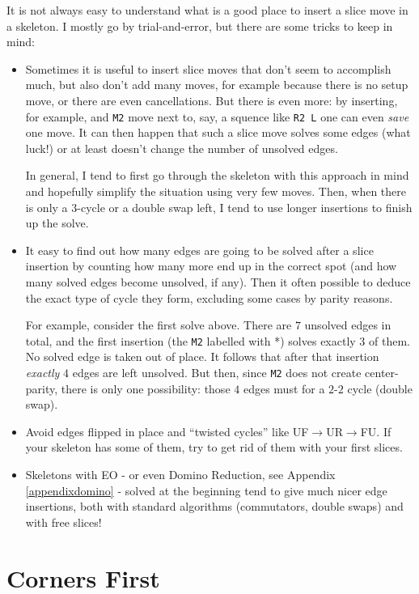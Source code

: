 \documentclass[11pt,a4paper]{book}
\newcommand{\m}{\texttt}
\begin{document}
It is not always easy to understand what is a good place to insert a slice move in a skeleton. I mostly go by trial-and-error, but there are some tricks to keep in mind:
\begin{itemize}
\item Sometimes it is useful to insert slice moves that don't seem to accomplish much, but also don't add many moves, for example because there is no setup move, or there are even cancellations. But there is even more: by inserting, for example, and \m{M2} move next to, say, a squence like \m{R2 L} one can even \textit{save} one move. It can then happen that such a slice move solves some edges (what luck!) or at least doesn't change the number of unsolved edges.

In general, I tend to first go through the skeleton with this approach in mind and hopefully simplify the situation using very few moves. Then, when there is only a 3-cycle or a double swap left, I tend to use longer insertions to finish up the solve.
\item It easy to find out how many edges are going to be solved after a slice insertion by counting how many more end up in the correct spot (and how many solved edges become unsolved, if any). Then it often possible to deduce the exact type of cycle they form, excluding some cases by parity reasons.

For example, consider the first solve above. There are $7$ unsolved edges in total, and the first insertion (the \m{M2} labelled with *) solves exactly 3 of them. No solved edge is taken out of place. It follows that after that insertion \textit{exactly} $4$ edges are left unsolved. But then, since \m{M2} does not create center-parity, there is only one possibility: those $4$ edges must for a $2$-$2$ cycle (double swap).
\item Avoid edges flipped in place and ``twisted cycles'' like UF$\to$UR$\to$FU. If your skeleton has some of them, try to get rid of them with your first slices.
\item Skeletons with EO - or even Domino Reduction, see Appendix \ref{appendixdomino} - solved at the beginning tend to give much nicer edge insertions, both with standard algorithms (commutators, double swaps) and with free slices!
\end{itemize}

\section{Corners First}
\label{corner-first}
\end{document}
